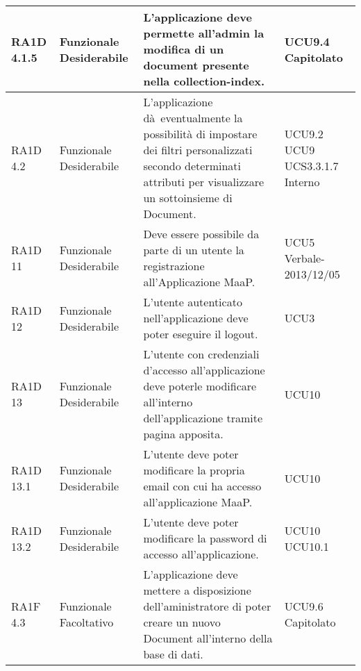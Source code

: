 \begin{center}
\begin{longtable}{ | l | p{2cm} | p{5cm} | p{1.7cm} |}
        RA1D 4.1.5 & Funzionale \newline  Desiderabile  & L'applicazione deve permette all'admin la modifica di un document presente nella collection-index. &  UCU9.4 \newline  Capitolato \newline  \\ \hline      
        RA1D 4.2  & Funzionale \newline  Desiderabile  & L'applicazione dà eventualmente la possibilità di impostare dei filtri personalizzati secondo determinati attributi per visualizzare un sottoinsieme di Document. &  UCU9.2 \newline  UCU9 \newline  UCS3.3.1.7 \newline  Interno \newline  \\ \hline      
        RA1D 11 & Funzionale \newline  Desiderabile  & Deve essere possibile da parte di un utente la registrazione all'Applicazione MaaP. &  UCU5 \newline  Verbale-2013/12/05 \newline  \\ \hline      
        RA1D 12 & Funzionale \newline  Desiderabile  & L'utente autenticato nell'applicazione deve poter eseguire il logout.  &  UCU3 \newline  \\ \hline      
        RA1D 13 & Funzionale \newline  Desiderabile  & L'utente con credenziali d'accesso all'applicazione deve poterle modificare all'interno dell'applicazione tramite pagina apposita. &  UCU10 \newline  \\ \hline      
        RA1D 13.1 & Funzionale \newline  Desiderabile  & L'utente deve poter modificare la propria email con cui ha accesso all'applicazione MaaP. &  UCU10 \newline  \\ \hline      
        RA1D 13.2 & Funzionale \newline  Desiderabile  & L'utente deve poter modificare la password di accesso all'applicazione. &  UCU10 \newline  UCU10.1 \newline  \\ \hline      
        RA1F 4.3 & Funzionale \newline  Facoltativo  & L'applicazione deve mettere a disposizione dell'aministratore di poter creare un nuovo Document all'interno della base di dati. &  UCU9.6 \newline  Capitolato \newline  \\ \hline      

\end{longtable}
\end{center}
